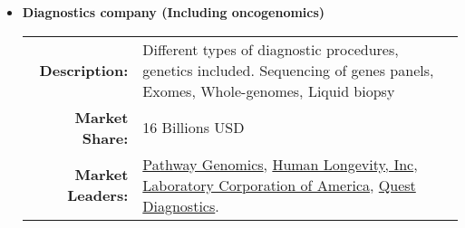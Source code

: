\begin{itemize}
  \item \textbf{Diagnostics company (Including oncogenomics)} \newline
  \begin{tabular}{r|p{11cm}} \hline
    \small\textbf{Description:}    & \small Different types of diagnostic procedures, genetics included. Sequencing of genes panels, Exomes, Whole-genomes, Liquid biopsy \\
    \small\textbf{Market Share:}   & \small 16 Billions USD  \\
    \small\textbf{Market Leaders:} & \small
      \href{https://www.pathway.com/}{Pathway Genomics},
      \href{http://www.humanlongevity.com/}{Human Longevity, Inc},
      \href{https://www.labcorp.com/}{Laboratory Corporation of America},
      \href{http://www.questdiagnostics.com/home.html}{Quest Diagnostics}.
  \end{tabular}
\end{itemize}
